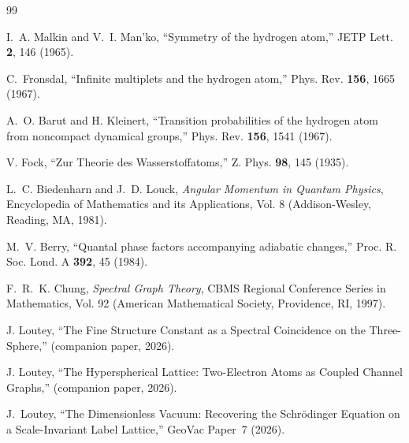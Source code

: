 \documentclass[aps,pra,twocolumn,superscriptaddress,longbibliography]{revtex4-2}
\begin{document}
\begin{thebibliography}{99}

I.~A. Malkin and V.~I. Man'ko,
``Symmetry of the hydrogen atom,''
JETP Lett. \textbf{2}, 146 (1965).

C.~Fronsdal,
``Infinite multiplets and the hydrogen atom,''
Phys. Rev. \textbf{156}, 1665 (1967).

A.~O. Barut and H. Kleinert,
``Transition probabilities of the hydrogen atom from noncompact dynamical groups,''
Phys. Rev. \textbf{156}, 1541 (1967).

V. Fock,
``Zur Theorie des Wasserstoffatoms,''
Z. Phys. \textbf{98}, 145 (1935).

L.~C. Biedenharn and J.~D. Louck,
\textit{Angular Momentum in Quantum Physics},
Encyclopedia of Mathematics and its Applications, Vol. 8 (Addison-Wesley, Reading, MA, 1981).

M.~V. Berry,
``Quantal phase factors accompanying adiabatic changes,''
Proc. R. Soc. Lond. A \textbf{392}, 45 (1984).

F.~R.~K. Chung,
\textit{Spectral Graph Theory},
CBMS Regional Conference Series in Mathematics, Vol. 92 (American Mathematical Society, Providence, RI, 1997).

J. Loutey,
``The Fine Structure Constant as a Spectral Coincidence on the Three-Sphere,''
(companion paper, 2026).

J. Loutey,
``The Hyperspherical Lattice: Two-Electron Atoms as Coupled Channel Graphs,''
(companion paper, 2026).

J.~Loutey,
``The Dimensionless Vacuum: Recovering the Schr\"odinger Equation on a Scale-Invariant Label Lattice,''
GeoVac Paper~7 (2026).
\end{thebibliography}
\end{document}
